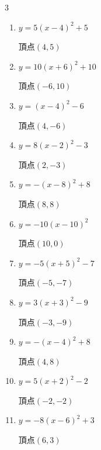 \begin{multicols}{3}
\begin{enumerate}
        $\displaystyle 頂点\left( 3 , 4 \right)$

  \item $\displaystyle y=5\left( x-4\right)^{2}+5$

        $\displaystyle 頂点\left( 4 , 5 \right)$

  \item $\displaystyle y=10\left( x+6\right)^{2}+10$

        $\displaystyle 頂点\left( -6 , 10 \right)$

  \item $\displaystyle y=\left( x-4\right)^{2}-6$

        $\displaystyle 頂点\left( 4 , -6 \right)$

  \item $\displaystyle y=8\left( x-2\right)^{2}-3$

        $\displaystyle 頂点\left( 2 , -3 \right)$

  \item $\displaystyle y=-\left( x-8\right)^{2}+8$

        $\displaystyle 頂点\left( 8 , 8 \right)$

  \item $\displaystyle y=-10\left( x-10\right)^{2}$

        $\displaystyle 頂点\left( 10 , 0 \right)$

  \item $\displaystyle y=-5\left( x+5\right)^{2}-7$

        $\displaystyle 頂点\left( -5 , -7 \right)$

\columnbreak %

\resetques

  \item $\displaystyle y=3\left( x+3\right)^{2}-9$

        $\displaystyle 頂点\left( -3 , -9 \right)$

  \item $\displaystyle y=-\left( x-4\right)^{2}+8$

        $\displaystyle 頂点\left( 4 , 8 \right)$

  \item $\displaystyle y=5\left( x+2\right)^{2}-2$

        $\displaystyle 頂点\left( -2 , -2 \right)$

  \item $\displaystyle y=-8\left( x-6\right)^{2}+3$

        $\displaystyle 頂点\left( 6 , 3 \right)$


\end{enumerate}
\end{multicols}
